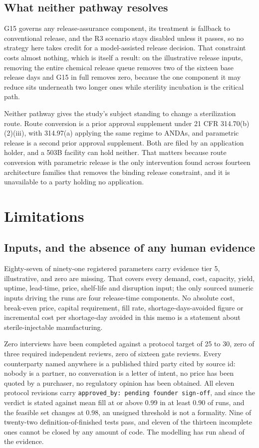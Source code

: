 \subsection{What neither pathway resolves}

G15 governs any release-assurance component, its treatment is fallback to conventional release,
and the R3 scenario stays disabled unless it passes, so no strategy here takes credit for a
model-assisted release decision. That constraint costs almost nothing, which is itself a result:
on the illustrative release inputs, removing the entire chemical release queue removes two of the
sixteen base release days and G15 in full removes zero, because the one component it may reduce
sits underneath two longer ones while sterility incubation is the critical path.

Neither pathway gives the study's subject standing to change a sterilization route. Route
conversion is a prior approval supplement under 21 CFR 314.70(b)(2)(iii), with 314.97(a) applying
the same regime to ANDAs, and parametric release is a second prior approval supplement. Both are
filed by an application holder, and a 503B facility can hold neither. That matters because route
conversion with parametric release is the only intervention found across fourteen architecture
families that removes the binding release constraint, and it is unavailable to a party holding no
application.

\section{Limitations}
\label{sec:limitations}

\subsection{Inputs, and the absence of any human evidence}

Eighty-seven of ninety-one registered parameters carry evidence tier 5, illustrative, and zero are
missing. That covers every demand, cost, capacity, yield, uptime, lead-time, price, shelf-life and
disruption input; the only sourced numeric inputs driving the runs are four release-time
components. No absolute cost, break-even price, capital requirement, fill rate, shortage-days-avoided
figure or incremental cost per shortage-day avoided in this memo is a statement about
sterile-injectable manufacturing.

Zero interviews have been completed against a protocol target of 25 to 30, zero of three required
independent reviews, zero of sixteen gate reviews. Every counterparty named anywhere is a published
third party cited by source id: nobody is a partner, no conversation is a letter of intent, no price
has been quoted by a purchaser, no regulatory opinion has been obtained. All eleven protocol
revisions carry \texttt{approved\_by: pending founder sign-off}, and since the verdict is stated
against mean fill at or above 0.99 in at least 0.90 of runs, and the feasible set changes at 0.98,
an unsigned threshold is not a formality. Nine of twenty-two definition-of-finished tests pass, and
eleven of the thirteen incomplete ones cannot be closed by any amount of code. The modelling has run
ahead of the evidence.

